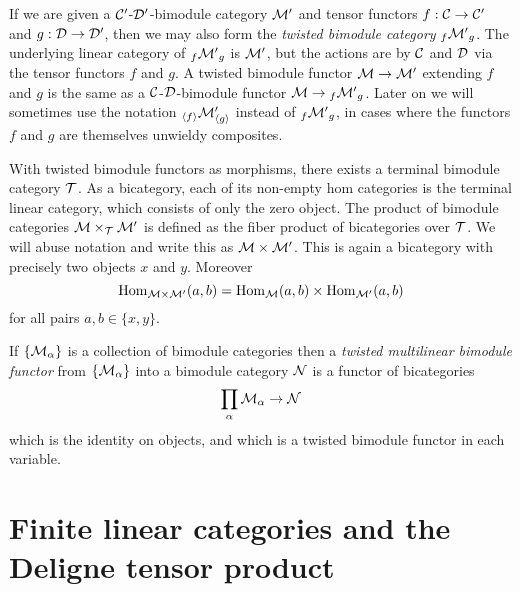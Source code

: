 \documentclass[a4paper]{amsart}
\begin{document}
If we are given a $\mathcal C'$-$\mathcal D'$-bimodule category $\mathcal M'$ and tensor functors $f:\mathcal C \to \mathcal C'$ and $g:\mathcal D \to \mathcal D'$, then we may also form the {\em twisted bimodule category} ${}_f{\mathcal M'}_g$.  The underlying linear category of ${}_f{\mathcal M'}_g$ is $\mathcal M'$, but the actions are by $\mathcal C$ and $\mathcal D$ via the tensor functors $f$ and $g$. A twisted bimodule functor $\mathcal M \to \mathcal M'$ extending $f$ and $g$ is the same as a $\mathcal C$-$\mathcal D$-bimodule functor $\mathcal M \to {}_f{\mathcal M'}_g$.  Later on we will sometimes use the notation ${}_{\langle f \rangle} \mathcal M'_{\langle g \rangle}$ instead of ${}_f{\mathcal M'}_g$, in cases where the functors $f$ and $g$ are themselves unwieldy composites.

With twisted bimodule functors as morphisms, there exists a terminal bimodule category $\mathcal T$. As a bicategory, each of its non-empty hom categories is the terminal linear category, which consists of only the zero object. %
The product of bimodule categories $\mathcal M \times_{\mathcal T} \mathcal M'$ is defined as the fiber product of bicategories over $\mathcal T$.     We will abuse notation and write this as $\mathcal M \times \mathcal M'$. This is again a bicategory with precisely two objects $x$ and $y$. Moreover
\begin{equation*}
	\operatorname{Hom}_{\mathcal M \times \mathcal M'}(a,b) = \operatorname{Hom}_\mathcal M(a,b) \times \operatorname{Hom}_{\mathcal M'}(a,b)
\end{equation*}
for all pairs $a,b \in \{ x,y \}$.

If $\{ \mathcal M_\alpha \}$ is a collection of bimodule categories then a {\em twisted multilinear bimodule functor} from $\{ \mathcal M_\alpha \}$ into a bimodule category $\mathcal N$ is a functor of bicategories
\begin{equation*}
	\prod_{\alpha} \mathcal M_\alpha \to \mathcal N
\end{equation*}
which is the identity on objects, and which is a twisted bimodule functor in each variable. 

\section{Finite linear categories and the Deligne tensor product} \label{sec-tc-deligne}
\end{document}
